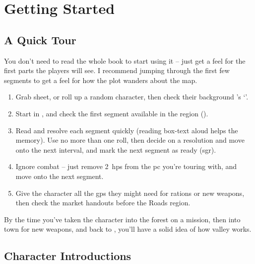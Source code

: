 \needspace{20em}

\section{Getting Started}
\label{theOpeningSession}

\begin{multicols}{2}

\subsection{A Quick Tour}

You don't need to read the whole book to start using it -- just get a feel for the first parts the players will see.
I recommend jumping through the first few \glspl{segment} to get a feel for how the plot wanders about the map.

\begin{enumerate}
  \item
  Grab  sheet, or roll up a random character, then check their background 's `'.
  \item
  Start in  , and check the first \gls{segment} available in the \gls{region} ().
  \item
  Read and resolve each \gls{segment} quickly (reading box-text aloud helps the memory).
  Use no more than one roll, then decide on a resolution and move onto the next \gls{interval}, and mark the next \gls{segment} as ready (\gls{sgr}).
  \item
  Ignore combat -- just remove 2~\glspl{hp} from the \gls{pc} you're touring with, and move onto the next \gls{segment}.
  \item
  Give the character all the \glspl{gp} they might need for \glspl{ration} or new \glspl{weapon}, then check the market handouts before the Roads \gls{region}.
\end{enumerate}

By the time you've taken the character into the forest on a mission, then into \gls{town} for new weapons, and back to , you'll have a solid idea of how \gls{valley} works.

\subsection{Character Introductions}
\label{greyBackgrounds}


\end{multicols}
